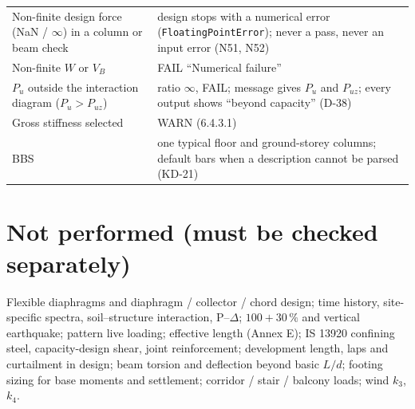 \documentclass[10pt,a4paper]{article}
\newcommand{\code}[1]{\texttt{\small #1}}
\begin{document}
\begin{longtable}{L{56mm}L{108mm}}
Non-finite design force (NaN / $\infty$) in a column or beam check & design stops with a numerical error
(\code{FloatingPointError}); never a pass, never an input error (N51, N52) \\
Non-finite $W$ or $V_B$ & FAIL ``Numerical failure'' \\
$P_u$ outside the interaction diagram ($P_u>P_{uz}$) & ratio $\infty$, FAIL; message gives $P_u$ and $P_{uz}$;
every output shows ``beyond capacity'' (D-38) \\
Gross stiffness selected & WARN (6.4.3.1) \\
BBS & one typical floor and ground-storey columns; default bars when a description cannot be parsed (KD-21) \\
\bottomrule
\end{longtable}

\section{Not performed (must be checked separately)}
Flexible diaphragms and diaphragm / collector / chord design; time history, site-specific spectra, soil--structure
interaction, P--$\Delta$; $100+30\,\%$ and vertical earthquake; pattern live loading; effective length (Annex E);
IS 13920 confining steel, capacity-design shear, joint reinforcement; development length, laps and curtailment in
design; beam torsion and deflection beyond basic $L/d$; footing sizing for base moments and settlement; corridor /
stair / balcony loads; wind $k_3$, $k_4$.

\end{document}
